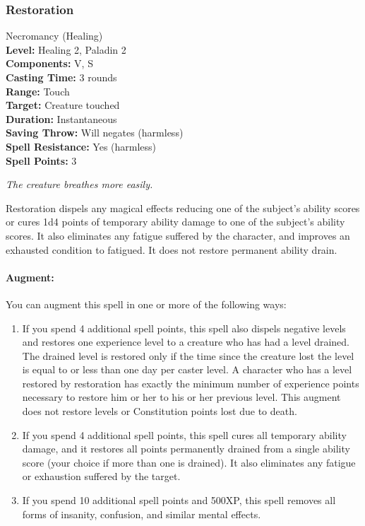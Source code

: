 \subsubsection{Restoration}
\label{Spell:Restoration}
Necromancy (Healing)
\\ \textbf{Level:} Healing 2, Paladin 2
\\ \textbf{Components:} V, S
\\ \textbf{Casting Time:} 3 rounds
\\ \textbf{Range:} Touch
\\ \textbf{Target:} Creature touched
\\ \textbf{Duration:} Instantaneous
\\ \textbf{Saving Throw:} Will negates (harmless)
\\ \textbf{Spell Resistance:} Yes (harmless)
\\ \textbf{Spell Points:} 3

\emph{The creature breathes more easily.}

Restoration dispels any magical effects reducing one of the subject's ability scores or cures 1d4 points of temporary ability damage to one of the subject's ability scores. 
It also eliminates any fatigue suffered by the character, and improves an exhausted condition to fatigued. 
It does not restore permanent ability drain.

\paragraph{Augment:} You can augment this spell in one or more of the following ways:
\begin{enumerate}
 \item If you spend 4 additional spell points, this spell also dispels negative levels and restores one experience level to a creature who has had a level drained. The drained level is restored only if the time since the creature lost the level is equal to or less than one day per caster level. 
A character who has a level restored by restoration has exactly the minimum number of experience points necessary to restore him or her to his or her previous level.
This augment does not restore levels or Constitution points lost due to death.
 \item If you spend 4 additional spell points, this spell cures all temporary ability damage, and it restores all points permanently drained from a single ability score (your choice if more than one is drained). 
It also eliminates any fatigue or exhaustion suffered by the target.
 \item If you spend 10 additional spell points and 500XP, this spell removes all forms of insanity, confusion, and similar mental effects.
\end{enumerate}
